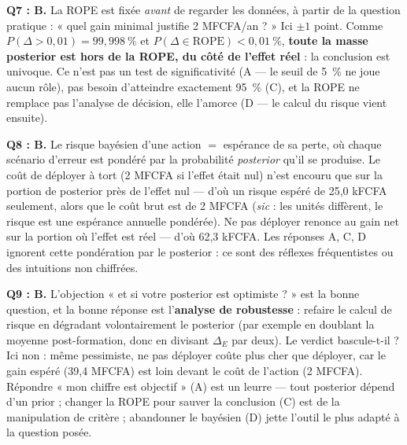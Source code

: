 \documentclass[11pt,a4paper]{article}
\begin{document}
\begin{corrigebox}
\textbf{Q7 : B.} La ROPE est fixée \emph{avant} de regarder les données, à
partir de la question pratique : « quel gain minimal justifie 2 MFCFA/an ? »
Ici $\pm 1$ point. Comme $P(\Delta > 0{,}01) = 99{,}998~\%$ et
$P(\Delta \in \text{ROPE}) < 0{,}01~\%$, \textbf{toute la masse posterior est
hors de la ROPE, du côté de l'effet réel} : la conclusion est univoque. Ce
n'est pas un test de significativité (A --- le seuil de 5~\% ne joue aucun
rôle), pas besoin d'atteindre exactement 95~\% (C), et la ROPE ne remplace
pas l'analyse de décision, elle l'amorce (D --- le calcul du risque vient
ensuite).

\textbf{Q8 : B.} Le risque bayésien d'une action $=$ espérance de sa perte,
où chaque scénario d'erreur est pondéré par la probabilité \emph{posterior}
qu'il se produise. Le coût de déployer à tort (2 MFCFA si l'effet était nul)
n'est encouru que sur la portion de posterior près de l'effet nul --- d'où un
risque espéré de 25,0 kFCFA seulement, alors que le coût brut est de 2 MFCFA
(\emph{sic} : les unités diffèrent, le risque est une espérance
annuelle pondérée). Ne pas déployer renonce au gain net sur la portion où
l'effet est réel --- d'où 62,3 kFCFA. Les réponses A, C, D ignorent cette
pondération par le posterior : ce sont des réflexes fréquentistes ou des
intuitions non chiffrées.

\textbf{Q9 : B.} L'objection « et si votre posterior est optimiste ? » est
la bonne question, et la bonne réponse est l'\textbf{analyse de robustesse} :
refaire le calcul de risque en dégradant volontairement le posterior (par
exemple en doublant la moyenne post-formation, donc en divisant $\Delta_E$
par deux). Le verdict bascule-t-il ? Ici non : même pessimiste, ne pas
déployer coûte plus cher que déployer, car le gain espéré (39,4 MFCFA) est
loin devant le coût de l'action (2 MFCFA). Répondre « mon chiffre est
objectif » (A) est un leurre --- tout posterior dépend d'un prior ; changer
la ROPE pour sauver la conclusion (C) est de la manipulation de critère ;
abandonner le bayésien (D) jette l'outil le plus adapté à la question posée.
\end{corrigebox}
\end{document}
